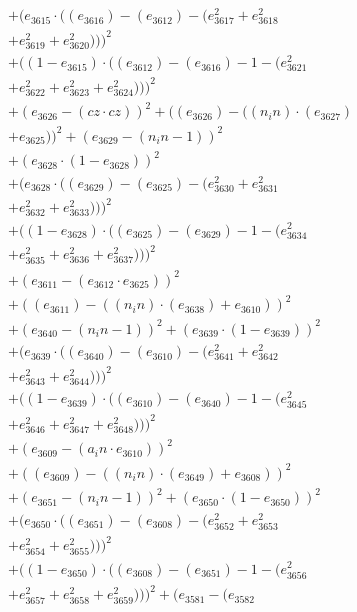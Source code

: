 \documentclass[10pt, a4paper]{article}
\begin{document}
\begin{align*}
& + (e_{3615}  \cdot  ((e_{3616}) - (e_{3612}) - (e_{3617}^{2} + e_{3618}^{2} \\
& + e_{3619}^{2} + e_{3620}^{2})))^{2} \\
& + ((1 - e_{3615})  \cdot  ((e_{3612}) - (e_{3616}) - 1 - (e_{3621}^{2} \\
& + e_{3622}^{2} + e_{3623}^{2} + e_{3624}^{2})))^{2} \\
& + (e_{3626} - (cz  \cdot  cz))^{2} + ((e_{3626}) - ((n_in)  \cdot  (e_{3627}) \\
& + e_{3625}))^{2} + (e_{3629} - (n_in - 1))^{2} \\
& + (e_{3628}  \cdot  (1 - e_{3628}))^{2} \\
& + (e_{3628}  \cdot  ((e_{3629}) - (e_{3625}) - (e_{3630}^{2} + e_{3631}^{2} \\
& + e_{3632}^{2} + e_{3633}^{2})))^{2} \\
& + ((1 - e_{3628})  \cdot  ((e_{3625}) - (e_{3629}) - 1 - (e_{3634}^{2} \\
& + e_{3635}^{2} + e_{3636}^{2} + e_{3637}^{2})))^{2} \\
& + (e_{3611} - (e_{3612}  \cdot  e_{3625}))^{2} \\
& + ((e_{3611}) - ((n_in)  \cdot  (e_{3638}) + e_{3610}))^{2} \\
& + (e_{3640} - (n_in - 1))^{2} + (e_{3639}  \cdot  (1 - e_{3639}))^{2} \\
& + (e_{3639}  \cdot  ((e_{3640}) - (e_{3610}) - (e_{3641}^{2} + e_{3642}^{2} \\
& + e_{3643}^{2} + e_{3644}^{2})))^{2} \\
& + ((1 - e_{3639})  \cdot  ((e_{3610}) - (e_{3640}) - 1 - (e_{3645}^{2} \\
& + e_{3646}^{2} + e_{3647}^{2} + e_{3648}^{2})))^{2} \\
& + (e_{3609} - (a_in  \cdot  e_{3610}))^{2} \\
& + ((e_{3609}) - ((n_in)  \cdot  (e_{3649}) + e_{3608}))^{2} \\
& + (e_{3651} - (n_in - 1))^{2} + (e_{3650}  \cdot  (1 - e_{3650}))^{2} \\
& + (e_{3650}  \cdot  ((e_{3651}) - (e_{3608}) - (e_{3652}^{2} + e_{3653}^{2} \\
& + e_{3654}^{2} + e_{3655}^{2})))^{2} \\
& + ((1 - e_{3650})  \cdot  ((e_{3608}) - (e_{3651}) - 1 - (e_{3656}^{2} \\
& + e_{3657}^{2} + e_{3658}^{2} + e_{3659}^{2})))^{2} + (e_{3581} - (e_{3582} \\

\end{align*}
\end{document}
